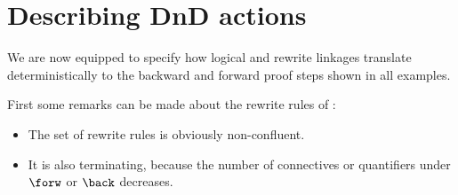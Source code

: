 




\section{Describing DnD actions}

We are now equipped to specify how logical and rewrite linkages translate
deterministically to the backward and forward proof steps shown in all examples.

First some remarks can be made about the rewrite rules of :
\begin{itemize}
\item The set of rewrite rules is obviously non-confluent. 
\item It is also terminating, because the number of connectives or quantifiers
  under $\forw$ or $\back$ decreases.
\end{itemize}

